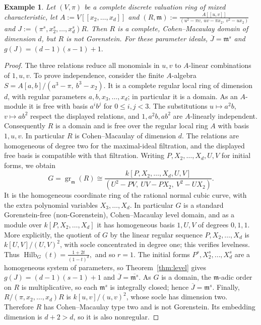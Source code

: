 \documentclass[11pt,a4paper]{amsart}
\numberwithin{equation}{section}
\newtheorem{example}[theorem]{Example}\newtheorem{notation}[theorem]{Notation}
\newcommand{\m}{\mathfrak m}
\newcommand{\ol}[1]{\overline{#1}}
\newcommand{\gr}{\operatorname{gr}}
\begin{document}
 \begin{example}
 	\label{determinantal}
 	Let $(V,\pi)$ be a complete discrete valuation ring of mixed
 	characteristic, let
 	$A:=V[[x_2,\ldots,x_d]]$ and
 	$(R, \m):=\frac{A[[u,v]]}
 	{(u^2-\pi v,\ uv-\pi x_2,\ v^2-u x_2)}$ and	$J:=(\pi^s,x_2^s,\ldots,x_d^s)R.$
 	Then $R$ is a complete, Cohen--Macaulay  domain of
 	dimension $d$, but $R$ is  not Gorenstein.
 	For these parameter ideals,
 	$ \ol J=\m^s$ and $	g(J)=(d-1)(s-1)+1.$
  \end{example}
 \begin{proof}
 	The three relations reduce all monomials in $u,v$ to
 	$A$-linear combinations of $1,u,v$.  To prove independence,
 	consider the finite $A$-algebra
 	$	S=A[a,b]/(a^3-\pi,\ b^3-x_2).$
 	It is a complete regular local ring of dimension $d$,
 	with regular parameters $a,b,x_3,\ldots,x_d$; in particular
 	it is a domain.  As an $A$-module it is free with basis
 	$a^i b^j$ for $0\leq i,j<3$.  The substitutions
 	$u\mapsto a^2b$, $v\mapsto ab^2$ respect the displayed
 	relations, and $1,a^2b,ab^2$ are $A$-linearly independent.
 	Consequently $R$ is a domain and is free over the regular
 	local ring $A$ with basis $1,u,v$.
 	In particular $R$ is Cohen--Macaulay of dimension $d$.
 	The relations are homogeneous of degree two for the
 	maximal-ideal filtration, and the displayed free basis
 	is compatible with that filtration.  Writing
 	$P,X_2,\ldots,X_d,U,V$ for initial forms, we obtain
 	$$G=\gr_\m ( R)\cong
 	\frac{k[P,X_2,\ldots,X_d,U,V]}
 	{(U^2-PV,\ UV-PX_2,\ V^2-UX_2)}.$$
 	It is the homogeneous coordinate ring of the rational
 	normal cubic curve, with the extra polynomial variables
 	$X_3,\ldots,X_d$.  In particular $G$ is a standard
 	Gorenstein-free (non-Gorenstein), Cohen--Macaulay level
 	domain, and as a module over
 	$k[P,X_2,\ldots,X_d]$ it has homogeneous basis $1,U,V$
 	of degrees $0,1,1$.  More explicitly, the quotient of
 	$G$ by the linear regular sequence
 	$P,X_2,\ldots,X_d$ is
 	$k[U,V]/(U,V)^2$, with socle concentrated in degree one;
 	this verifies levelness.  Thus
 	$ \operatorname{Hilb}_G(t)=\frac{1+2t}{(1-t)^d},$ and so $r=1$.
 	The initial forms $P^s,X_2^s,\ldots,X_d^s$ are a homogeneous
 	system of parameters, so Theorem~\ref{thm:level} gives
 	$g(J)=(d-1)(s-1)+1$ and $\ol J=\ol{\m^s}$.
 	As $G$ is a domain, the $\m$-adic order on $R$ is
 	multiplicative, so each $\m^s$ is integrally closed;
 	hence $\ol J=\m^s$.
 	Finally, $R/(\pi,x_2,\ldots,x_d)R$ is
 	$k[u,v]/(u,v)^2$, whose socle has dimension two.
 	Therefore $R$ has Cohen--Macaulay type two and is not
 	Gorenstein.  Its embedding dimension is $d+2>d$, so it is
 	also nonregular.
 \end{proof}
\end{document}
